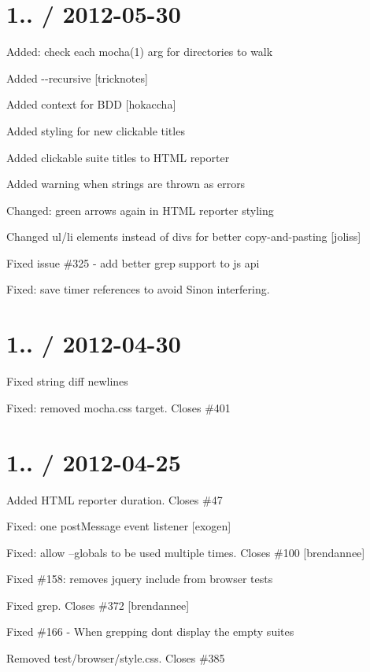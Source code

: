 \section*{1.. / 2012-\/05-\/30}


\begin{DoxyItemize}
\item Added\+: check each {\ttfamily mocha(1)} arg for directories to walk
\item Added {\ttfamily -\/-\/recursive} \mbox{[}tricknotes\mbox{]}
\item Added {\ttfamily context} for B\+DD \mbox{[}hokaccha\mbox{]}
\item Added styling for new clickable titles
\item Added clickable suite titles to H\+T\+ML reporter
\item Added warning when strings are thrown as errors
\item Changed\+: green arrows again in H\+T\+ML reporter styling
\item Changed ul/li elements instead of divs for better copy-\/and-\/pasting \mbox{[}joliss\mbox{]}
\item Fixed issue \#325 -\/ add better grep support to js api
\item Fixed\+: save timer references to avoid Sinon interfering.
\end{DoxyItemize}

\section*{1.. / 2012-\/04-\/30}


\begin{DoxyItemize}
\item Fixed string diff newlines
\item Fixed\+: removed mocha.\+css target. Closes \#401
\end{DoxyItemize}

\section*{1.. / 2012-\/04-\/25}


\begin{DoxyItemize}
\item Added H\+T\+ML reporter duration. Closes \#47
\item Fixed\+: one post\+Message event listener \mbox{[}exogen\mbox{]}
\item Fixed\+: allow --globals to be used multiple times. Closes \#100 \mbox{[}brendannee\mbox{]}
\item Fixed \#158\+: removes jquery include from browser tests
\item Fixed grep. Closes \#372 \mbox{[}brendannee\mbox{]}
\item Fixed \#166 -\/ When grepping don\textquotesingle{}t display the empty suites
\item Removed test/browser/style.\+css. Closes \#385
\end{DoxyItemize}

